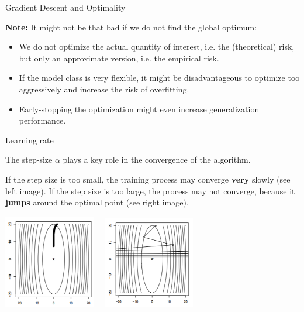 \begin{vbframe}{Gradient Descent and Optimality}
  \framebreak 

  \textbf{Note: } It might not be that bad if we do not find the global optimum:  

  \begin{itemize}
    \item We do not optimize the actual quantity of interest, i.e. the (theoretical) risk, but only an approximate version, i.e. the empirical risk. 
    \item If the model class is very flexible, it might be disadvantageous to optimize too aggressively and increase the risk of overfitting. 
    \item Early-stopping the optimization might even increase generalization performance. 
  \end{itemize}

\end{vbframe}


\begin{vbframe}{Learning rate}

The step-size $\alpha$ plays a key role in the convergence of the algorithm.
\lz

If the step size is too small, the training process may converge \textbf{very} slowly (see left image). If the step size is too large, the process may not converge, because it \textbf{jumps} around the optimal point (see right image).

\begin{center}
\includegraphics[width = 0.3\textwidth]{figure/stepsize_small.png}~~
\includegraphics[width = 0.3\textwidth]{figure/stepsize_large.png}
\end{center}

\end{vbframe}

